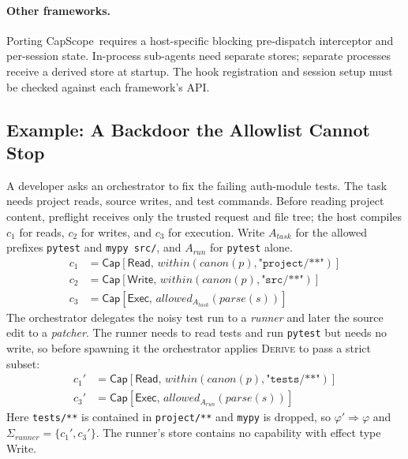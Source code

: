 \documentclass[sigplan,review,anonymous]{acmart}
\newcommand{\tool}{CapScope\xspace}
\renewcommand{\Cap}[2]{\textsf{Cap}[{#1},\,{#2}]}
\newcommand{\rulename}[1]{\textsc{#1}}
\begin{document}
  \paragraph{Other frameworks.}
  Porting \tool\ requires a host-specific blocking pre-dispatch interceptor and
  per-session state. In-process sub-agents need separate stores; separate
  processes receive a derived store at startup. The hook registration and
  session setup must be checked against each framework's API.

  \subsection{Example: A Backdoor the Allowlist Cannot Stop}
  \label{sec:example}
  A developer asks an orchestrator to fix the failing auth-module tests. The
  task needs project reads, source writes, and test commands. Before reading
  project content, preflight receives only the trusted request and file tree;
  the host compiles $c_1$ for reads, $c_2$ for writes, and $c_3$ for execution.
  Write $A_{\mathit{task}}$ for the allowed prefixes \texttt{pytest} and
  \texttt{mypy src/}, and $A_{\mathit{run}}$ for \texttt{pytest} alone.
  \begin{align}
    c_1 &= \Cap{\textsf{Read}}{\mathit{within}(\mathit{canon}(p),
          \texttt{"project/**"})} \label{cap:read} \\
    c_2 &= \Cap{\textsf{Write}}{\mathit{within}(\mathit{canon}(p),
          \texttt{"src/**"})} \label{cap:edit} \\
    c_3 &= \Cap{\textsf{Exec}}
          {\mathit{allowed}_{A_{\mathit{task}}}(\mathit{parse}(s))} \label{cap:exec}
  \end{align}
  The orchestrator delegates the noisy test run to a \emph{runner} and later the
  source edit to a \emph{patcher}. The runner needs to read tests and run
  \texttt{pytest} but needs no write, so before spawning it the orchestrator
  applies \rulename{Derive} to pass a strict subset:
  \begin{align}
    c_1' &= \Cap{\textsf{Read}}{\mathit{within}(\mathit{canon}(p),
            \texttt{"tests/**"})} \label{cap:dread} \\
    c_3' &= \Cap{\textsf{Exec}}
            {\mathit{allowed}_{A_{\mathit{run}}}(\mathit{parse}(s))}
            \label{cap:dexec}
  \end{align}
  Here \texttt{tests/**} is contained in \texttt{project/**} and \texttt{mypy}
  is dropped, so $\varphi' \Rightarrow \varphi$ and
  $\Sigma_{\mathit{runner}} = \{c_1', c_3'\}$. The runner's store contains no
  capability with effect type \textsf{Write}.
\end{document}
